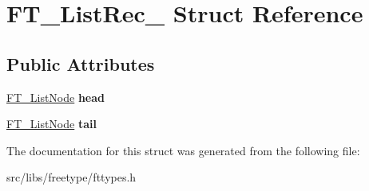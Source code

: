 \hypertarget{struct_f_t___list_rec__}{
\section{FT\_\-ListRec\_\- Struct Reference}
\label{struct_f_t___list_rec__}
}
\subsection*{Public Attributes}
\begin{DoxyCompactItemize}
\item 
\hypertarget{struct_f_t___list_rec___a09ed35c2bcdc1c3acd12ff4650dfdeb9}{
\hyperlink{struct_f_t___list_node_rec__}{FT\_\-ListNode} {\bfseries head}}
\label{struct_f_t___list_rec___a09ed35c2bcdc1c3acd12ff4650dfdeb9}

\item 
\hypertarget{struct_f_t___list_rec___a4664761f0ab2af3d48231b00cd978b23}{
\hyperlink{struct_f_t___list_node_rec__}{FT\_\-ListNode} {\bfseries tail}}
\label{struct_f_t___list_rec___a4664761f0ab2af3d48231b00cd978b23}

\end{DoxyCompactItemize}


The documentation for this struct was generated from the following file:\begin{DoxyCompactItemize}
\item 
src/libs/freetype/fttypes.h\end{DoxyCompactItemize}
